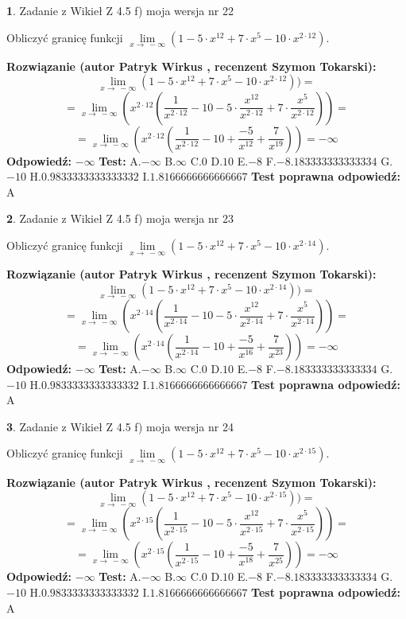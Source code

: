 \documentclass[12pt, a4paper]{article}
\theoremstyle{definition} %
\newtheorem{zad}{}
\newcommand{\zadStart}[1]{\begin{zad}#1\newline}
\newcommand{\zadStop}{\end{zad}}
\newcommand{\rozwStart}[2]{\noindent \textbf{Rozwiązanie (autor #1 , recenzent #2): }\newline}
\newcommand{\rozwStop}{\newline}
\newcommand{\odpStart}{\noindent \textbf{Odpowiedź:}\newline}
\newcommand{\odpStop}{\newline}
\newcommand{\testStart}{\noindent \textbf{Test:}\newline}
\newcommand{\testStop}{\newline}
\newcommand{\kluczStart}{\noindent \textbf{Test poprawna odpowiedź:}\newline}
\newcommand{\kluczStop}{\newline}
\begin{document}
\zadStart{Zadanie z Wikieł Z 4.5 f) moja wersja nr 22}


Obliczyć granicę funkcji  $\lim\limits_{x\to\ -\infty}(1 - 5 \cdot x^{12}+7 \cdot x^{5}- 10 \cdot x^{2\cdot12})$.
\zadStop
\rozwStart{Patryk Wirkus}{Szymon Tokarski}
$$\lim\limits_{x\to\ -\infty}(1 - 5 \cdot x^{12}+7 \cdot x^{5}- 10 \cdot x^{2\cdot12}))=$$
$$=\lim\limits_{x\to\ -\infty}(x^{2\cdot12}(\frac{1}{x^{2\cdot12}}-10 -5 \cdot \frac{x^{12}}{x^{2\cdot12}}+7 \cdot \frac{x^{5}}{x^{2\cdot12}}))=$$
$$=\lim\limits_{x\to\ -\infty}(x^{2\cdot12}(\frac{1}{x^{2\cdot12}}-10 + \frac{-5}{x^{12}}+ \frac{7}{x^{19}}))=-\infty$$
\rozwStop
\odpStart
$-\infty$
\odpStop
\testStart
A.$-\infty$ B.$\infty$ C.$0$ D.$10$ E.$-8$
F.$-8.183333333333334$ G.$-10$
H.$0.9833333333333332$
I.$1.8166666666666667$
\testStop
\kluczStart
A
\kluczStop



\zadStart{Zadanie z Wikieł Z 4.5 f) moja wersja nr 23}


Obliczyć granicę funkcji  $\lim\limits_{x\to\ -\infty}(1 - 5 \cdot x^{12}+7 \cdot x^{5}- 10 \cdot x^{2\cdot14})$.
\zadStop
\rozwStart{Patryk Wirkus}{Szymon Tokarski}
$$\lim\limits_{x\to\ -\infty}(1 - 5 \cdot x^{12}+7 \cdot x^{5}- 10 \cdot x^{2\cdot14}))=$$
$$=\lim\limits_{x\to\ -\infty}(x^{2\cdot14}(\frac{1}{x^{2\cdot14}}-10 -5 \cdot \frac{x^{12}}{x^{2\cdot14}}+7 \cdot \frac{x^{5}}{x^{2\cdot14}}))=$$
$$=\lim\limits_{x\to\ -\infty}(x^{2\cdot14}(\frac{1}{x^{2\cdot14}}-10 + \frac{-5}{x^{16}}+ \frac{7}{x^{23}}))=-\infty$$
\rozwStop
\odpStart
$-\infty$
\odpStop
\testStart
A.$-\infty$ B.$\infty$ C.$0$ D.$10$ E.$-8$
F.$-8.183333333333334$ G.$-10$
H.$0.9833333333333332$
I.$1.8166666666666667$
\testStop
\kluczStart
A
\kluczStop



\zadStart{Zadanie z Wikieł Z 4.5 f) moja wersja nr 24}


Obliczyć granicę funkcji  $\lim\limits_{x\to\ -\infty}(1 - 5 \cdot x^{12}+7 \cdot x^{5}- 10 \cdot x^{2\cdot15})$.
\zadStop
\rozwStart{Patryk Wirkus}{Szymon Tokarski}
$$\lim\limits_{x\to\ -\infty}(1 - 5 \cdot x^{12}+7 \cdot x^{5}- 10 \cdot x^{2\cdot15}))=$$
$$=\lim\limits_{x\to\ -\infty}(x^{2\cdot15}(\frac{1}{x^{2\cdot15}}-10 -5 \cdot \frac{x^{12}}{x^{2\cdot15}}+7 \cdot \frac{x^{5}}{x^{2\cdot15}}))=$$
$$=\lim\limits_{x\to\ -\infty}(x^{2\cdot15}(\frac{1}{x^{2\cdot15}}-10 + \frac{-5}{x^{18}}+ \frac{7}{x^{25}}))=-\infty$$
\rozwStop
\odpStart
$-\infty$
\odpStop
\testStart
A.$-\infty$ B.$\infty$ C.$0$ D.$10$ E.$-8$
F.$-8.183333333333334$ G.$-10$
H.$0.9833333333333332$
I.$1.8166666666666667$
\testStop
\kluczStart
A
\kluczStop
\end{document}
